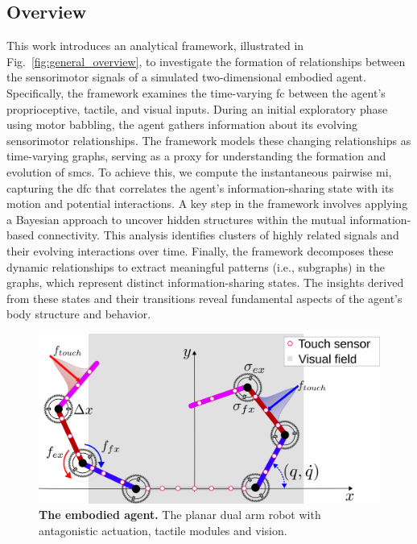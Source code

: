 \subsection{Overview}
This work introduces an analytical framework, illustrated in Fig.~\ref{fig:general_overview}, to investigate the formation of relationships between the sensorimotor signals of a simulated two-dimensional embodied agent. Specifically, the framework examines the time-varying \acl{fc} between the agent's proprioceptive, tactile, and visual inputs. During an initial exploratory phase using motor babbling, the agent gathers information about its evolving sensorimotor relationships. The framework models these changing relationships as time-varying graphs, serving as a proxy for understanding the formation and evolution of \acp{smc}. To achieve this, we compute the instantaneous pairwise \ac{mi}, capturing the \acl{dfc} that correlates the agent’s information-sharing state with its motion and potential interactions. A key step in the framework involves applying a Bayesian approach to uncover hidden structures within the mutual information-based connectivity. This analysis identifies clusters of highly related signals and their evolving interactions over time. Finally, the framework decomposes these dynamic relationships to extract meaningful patterns (i.e., subgraphs) in the graphs, which represent distinct information-sharing states. The insights derived from these states and their transitions reveal fundamental aspects of the agent’s body structure and behavior.
\begin{figure}[!t]
	\begin{center}
		\hspace*{\fill}
		\includegraphics[width=0.99\columnwidth]{extended_planar_dual_arm_with_vision.png}
		\hspace*{\fill}
	\end{center}
	\caption{\label{fig:extended_dual_arm_robot} \textbf{The embodied agent.} The planar dual arm robot with antagonistic actuation, tactile modules and vision.}
\end{figure}

